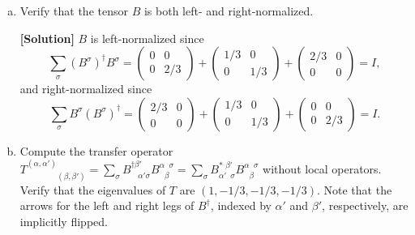\documentclass[11pt,a4paper,oneside]{article}
\begin{document}
\begin{enumerate}[(a)]

\item
Verify that the tensor $B$ is both left- and right-normalized.

\textbf{[Solution]}
$B$ is left-normalized since
\begin{equation}
\sum_\sigma (B^\sigma)^\dagger B^\sigma  =
\begin{pmatrix}
0 & 0 \\ 0 & 2/3
\end{pmatrix}
+
\begin{pmatrix}
1/3 & 0 \\ 0 & 1/3
\end{pmatrix}
+
\begin{pmatrix}
2/3 & 0 \\ 0 & 0
\end{pmatrix}
= I,
\end{equation}
and right-normalized since
\begin{equation}
\sum_\sigma B^\sigma (B^\sigma)^\dagger =
\begin{pmatrix}
2/3 & 0 \\ 0 & 0
\end{pmatrix}
+
\begin{pmatrix}
1/3 & 0 \\ 0 & 1/3
\end{pmatrix}
+
\begin{pmatrix}
0 & 0 \\ 0 & 2/3
\end{pmatrix}
= I.
\end{equation}


\item
Compute the transfer operator $T^{(\alpha, \alpha')}_{\phantom{(\alpha, \alpha')} (\beta, \beta')} = \sum_{\sigma} B^{\dagger \beta'}_{\phantom{\beta'} \alpha'  \sigma} B^{\alpha \phantom{\beta} \sigma}_{\phantom{\alpha} \beta} = \sum_{\sigma} B^{* \,\, \beta'}_{\alpha' \,\,\, \sigma} B^{\alpha \phantom{\beta} \sigma}_{\phantom{\alpha} \beta}$ without local operators.
Verify that the eigenvalues of $T$ are $(1, -1/3, -1/3, -1/3)$.
Note that the arrows for the left and right legs of $B^\dagger$, indexed by $\alpha'$ and $\beta'$, respectively, are implicitly flipped.


\end{enumerate}
\end{document}
